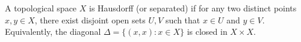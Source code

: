 A topological space $X$ is Hausdorff (or separated) if for any two distinct points $x, y \in X$, there exist disjoint open sets $U, V$ such that $x \in U$ and $y \in V$. Equivalently, the diagonal $\Delta = \{(x, x) : x \in X\}$ is closed in $X \times X$.
